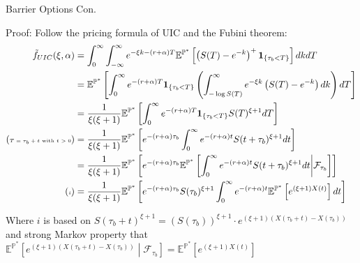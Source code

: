 \documentclass{beamer}
\begin{document}
\begin{frame}{Barrier Options Con.}

    {\footnotesize \scriptsize
    \par Proof: Follow the pricing formula of UIC and the Fubini theorem:
    \begin{align*}
        \tilde{f}_{UIC}(\xi, \alpha) &= \int_{0}^{\infty} \int_{-\infty}^{\infty} e^{-\xi k - (r + \alpha) T}
         \mathbb{E}^{\mathbb{P}^*} \left[ \left( S(T) - e^{-k} \right)^+ \mathbf{1}_{\{\tau_b < T\}} \right] dkdT\\
        & = \mathbb{E}^{\mathbb{P}^*} \left[ \int_{0}^{\infty} e^{-(r + \alpha) T} \mathbf{1}_{\{\tau_b < T\}}
          \left( \int_{-\log S(T)}^{\infty} e^{-\xi k} \left( S(T) - e^{-k} \right) dk \right) dT \right]\\
          &= \frac{1}{\xi (\xi + 1)} \mathbb{E}^{\mathbb{P}^*} \left[ \int_{0}^{\infty} e^{-(r + \alpha) T} \mathbf{1}_{\{\tau_b < T\}} S(T)^{\xi + 1} dT \right] \\
          {\footnotesize \tiny(\text{$T = \tau_b + t$ with $t>0$})} &=\frac{1}{\xi (\xi + 1)} \mathbb{E}^{\mathbb{P}^*} \left[ e^{-(r + \alpha) \tau_b} \int_{0}^{\infty} e^{-(r + \alpha) t} S(t + \tau_b)^{\xi + 1} 
          dt \right]\\
          &=\frac{1}{\xi (\xi + 1)} \mathbb{E}^{\mathbb{P}^*} \left[ e^{-(r + \alpha) \tau_b} 
            \mathbb{E}^ {\mathbb{P}^*} \left[ \int_{0}^{\infty} e^{-(r + \alpha) t} S(t + \tau_b)^{\xi + 1} dt \middle| \mathcal{F}_{\tau_b} \right] 
           \right]\\
           {\footnotesize \tiny(\text{$i$})}&=\frac{1}{\xi (\xi + 1)} \mathbb{E}^{\mathbb{P}^*} \left[ e^{-(r + \alpha) \tau_b} 
            S(\tau_b)^{\xi+1} \int_0^\infty e^{-(r+\alpha)t} \mathbb{E}^{\mathbb{P}^*} \left[ e^{(\xi+1)X(t)} \right]  dt 
           \right]\\
    \end{align*}
    \vspace{-2em}
    \par Where $i$ is based on $S(\tau_b + t)^{\xi+1} = \left(S(\tau_b)\right)^{\xi+1} \cdot e^{(\xi+1)(X(\tau_b + t) - X(\tau_b))}$ and 
    strong Markov property that $\mathbb{E}^{\mathbb{P}^*} \left[ e^{(\xi+1)(X(\tau_b + t) - X(\tau_b))} \middle| \mathcal{F}_{\tau_b} \right] 
    = \mathbb{E}^{\mathbb{P}^*} \left[ e^{(\xi+1)X(t)} \right]$
    
    }
\end{frame}
\end{document}
